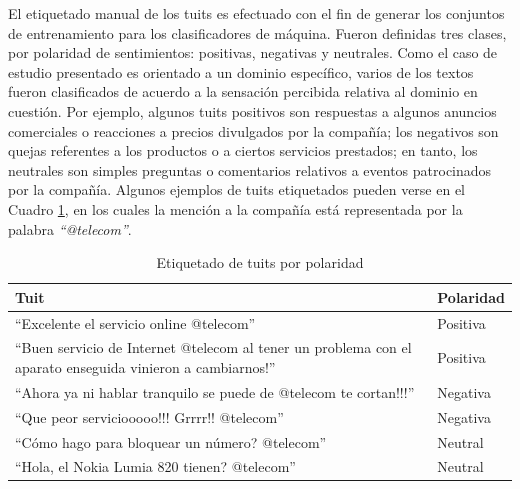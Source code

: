 \begin{itemize}
\newline \newline
El etiquetado manual de los tuits es efectuado con el fin de generar los conjuntos de entrenamiento para los clasificadores de m\'aquina. Fueron definidas tres clases, por polaridad de sentimientos: positivas, negativas y neutrales. Como el caso de estudio presentado es orientado a un dominio espec\'ifico, varios de los textos fueron clasificados de acuerdo a la sensaci\'on percibida relativa al dominio en cuesti\'on. Por ejemplo, algunos tuits positivos son respuestas a algunos anuncios comerciales o reacciones a precios divulgados por la compa\~n\'ia; los negativos son quejas referentes a los productos o a ciertos servicios prestados; en tanto, los neutrales son simples preguntas o comentarios relativos a eventos patrocinados por la compa\~n\'ia. Algunos ejemplos de tuits etiquetados pueden verse en el Cuadro \ref{etiquetado}, en los cuales la menci\'on a la compa\~n\'ia est\'a representada por la palabra \textit{``@telecom''}.

\begin{table}[htb] 
\centering
\begin{tabular}{|p{10cm}|p{2cm}|}
\hline
\textbf{Tuit}	&	\textbf{Polaridad}	\\
\hline
``Excelente el servicio online @telecom''	&	Positiva	\\
\hline
``Buen servicio de Internet @telecom al tener un problema con el aparato enseguida vinieron a cambiarnos!''	& Positiva	\\
\hline
``Ahora ya ni hablar tranquilo se puede de @telecom te cortan!!!''	&	Negativa	\\
\hline
``Que peor serviciooooo!!! Grrrr!! @telecom''	&	Negativa	\\
\hline
``C\'omo hago para bloquear un n\'umero? @telecom''	&	Neutral	\\
\hline
``Hola, el Nokia Lumia 820 tienen? @telecom''	&	Neutral	\\
\hline
\end{tabular}
\caption{Etiquetado de tuits por polaridad}
\label{etiquetado}
\end{table}


\end{itemize}
